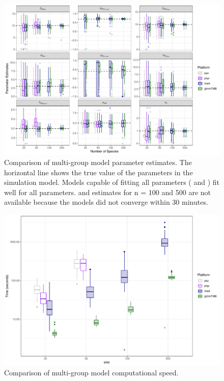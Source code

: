 \documentclass[12pt]{article}
\begin{document}
\begin{center}
\begin{figure}[H]
  \includegraphics[scale=0.7]{./figure/msplot.pdf}
  \caption{Comparison of multi-group model parameter estimates. The horizontal line shows the true value of the parameters in the simulation model. Models capable of fitting all parameters ( and ) fit well for all parameters.  and  estimates for n = 100 and 500 are not available because the models did not converge within 30 minutes. 
  }
  \label{msplot}
\end{figure}
\end{center}
\begin{center}
\begin{figure}[H]
  \includegraphics[scale=0.7]{./figure/mstime.pdf}
  \caption{Comparison of multi-group model computational speed.}
  \label{msplot_time}
\end{figure}
\end{center}
\end{document}
